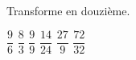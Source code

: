 %
%
Transforme en douzième.
  \begin{tasks}
    \task $\dfrac{9}{6}$
    \task $\dfrac{8}{3}$
    \task $\dfrac{9}{9}$
    \task $\dfrac{14}{24}$
    \task $\dfrac{27}{9}$
    \task $\dfrac{72}{32}$
  \end{tasks}
